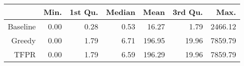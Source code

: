 \begin{table}[ht]
\centering
\begin{tabular}{rrrrrrr}
  \hline
 & Min. & 1st Qu. & Median & Mean & 3rd Qu. & Max. \\ 
  \hline
Baseline & 0.00 & 0.28 & 0.53 & 16.27 & 1.79 & 2466.12 \\ 
  Greedy & 0.00 & 1.79 & 6.71 & 196.95 & 19.96 & 7859.79 \\ 
  TFPR & 0.00 & 1.79 & 6.59 & 196.29 & 19.96 & 7859.79 \\ 
   \hline
\end{tabular}
\end{table}

